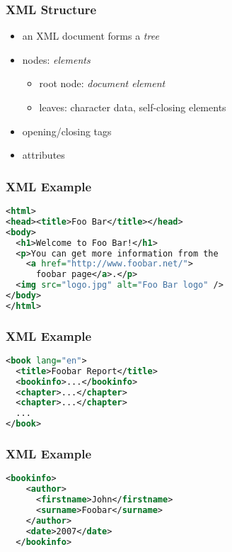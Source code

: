 \documentclass[dvipsnames]{beamer}
\theoremstyle{plain}
\begin{document}
\begin{frame}
  \frametitle{XML Structure}

  \begin{itemize}
    \item an XML document forms a \emph{tree}

    \item nodes: \emph{elements}
    \begin{itemize}
      \item root node: \emph{document element}
      \item leaves: character data, self-closing elements
    \end{itemize}

    \pause
    \medskip
    \item opening/closing tags
    \item attributes
  \end{itemize}
\end{frame}

\begin{frame}[fragile]
  \frametitle{XML Example}

  \begin{example}[HTML]
    \begin{lstlisting}[language=XML]
<html>
<head><title>Foo Bar</title></head>
<body>
  <h1>Welcome to Foo Bar!</h1>
  <p>You can get more information from the
    <a href="http://www.foobar.net/">
      foobar page</a>.</p>
  <img src="logo.jpg" alt="Foo Bar logo" />
</body>
</html>
    \end{lstlisting}
  \end{example}
\end{frame}

\begin{frame}[fragile]
  \frametitle{XML Example}

  \begin{example}[DocBook]
    \begin{lstlisting}[language=XML]
<book lang="en">
  <title>Foobar Report</title>
  <bookinfo>...</bookinfo>
  <chapter>...</chapter>
  <chapter>...</chapter>
  ...
</book>
    \end{lstlisting}
  \end{example}
\end{frame}

\begin{frame}[fragile]
  \frametitle{XML Example}

  \begin{example}[DocBook]
    \begin{lstlisting}[language=XML]
  <bookinfo>
    <author>
      <firstname>John</firstname>
      <surname>Foobar</surname>
    </author>
    <date>2007</date>
  </bookinfo>
    \end{lstlisting}
  \end{example}
\end{frame}
\end{document}

